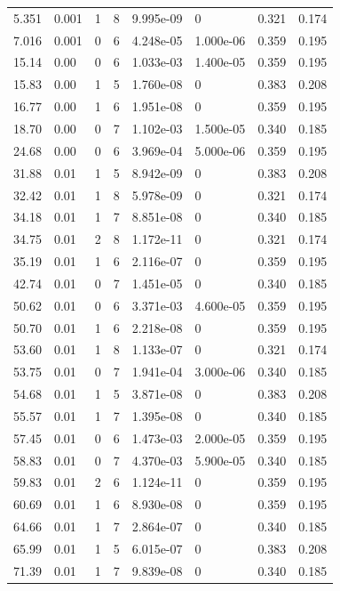 \documentclass[preview]{standalone}
\begin{document}
{{\begin{tabular}{L{1.2cm}C{1.2cm} C{0.3cm}C{0.5cm} C{1.4cm}C{1.4cm} C{1.4cm}C{1.4cm}}
  5.351  &  0.001  & 1     &  8 &  9.995e-09  & 0  & 0.321 &  0.174   \\ 
  7.016  &  0.001  & 0     &  6 &  4.248e-05  & 1.000e-06  & 0.359 &  0.195   \\ 
  15.14  &  0.00  & 0     &  6 &  1.033e-03  & 1.400e-05  & 0.359 &  0.195   \\ 
  15.83  &  0.00  & 1     &  5 &  1.760e-08  & 0  & 0.383 &  0.208   \\ 
  16.77  &  0.00  & 1     &  6 &  1.951e-08  & 0  & 0.359 &  0.195   \\ 
  18.70  &  0.00  & 0     &  7 &  1.102e-03  & 1.500e-05  & 0.340 &  0.185   \\ 
  24.68  &  0.00  & 0     &  6 &  3.969e-04  & 5.000e-06  & 0.359 &  0.195   \\ 
  31.88  &  0.01  & 1     &  5 &  8.942e-09  & 0  & 0.383 &  0.208   \\ 
  32.42  &  0.01  & 1     &  8 &  5.978e-09  & 0  & 0.321 &  0.174   \\ 
  34.18  &  0.01  & 1     &  7 &  8.851e-08  & 0  & 0.340 &  0.185   \\ 
  34.75  &  0.01  & 2     &  8 &  1.172e-11  & 0  & 0.321 &  0.174   \\ 
  35.19  &  0.01  & 1     &  6 &  2.116e-07  & 0  & 0.359 &  0.195   \\ 
  42.74  &  0.01  & 0     &  7 &  1.451e-05  & 0  & 0.340 &  0.185   \\ 
  50.62  &  0.01  & 0     &  6 &  3.371e-03  & 4.600e-05  & 0.359 &  0.195   \\ 
  50.70  &  0.01  & 1     &  6 &  2.218e-08  & 0  & 0.359 &  0.195   \\ 
  53.60  &  0.01  & 1     &  8 &  1.133e-07  & 0  & 0.321 &  0.174   \\ 
  53.75  &  0.01  & 0     &  7 &  1.941e-04  & 3.000e-06  & 0.340 &  0.185   \\ 
  54.68  &  0.01  & 1     &  5 &  3.871e-08  & 0  & 0.383 &  0.208   \\ 
  55.57  &  0.01  & 1     &  7 &  1.395e-08  & 0  & 0.340 &  0.185   \\ 
  57.45  &  0.01  & 0     &  6 &  1.473e-03  & 2.000e-05  & 0.359 &  0.195   \\ 
  58.83  &  0.01  & 0     &  7 &  4.370e-03  & 5.900e-05  & 0.340 &  0.185   \\ 
  59.83  &  0.01  & 2     &  6 &  1.124e-11  & 0  & 0.359 &  0.195   \\ 
  60.69  &  0.01  & 1     &  6 &  8.930e-08  & 0  & 0.359 &  0.195   \\ 
  64.66  &  0.01  & 1     &  7 &  2.864e-07  & 0  & 0.340 &  0.185   \\ 
  65.99  &  0.01  & 1     &  5 &  6.015e-07  & 0  & 0.383 &  0.208   \\ 
  71.39  &  0.01  & 1     &  7 &  9.839e-08  & 0  & 0.340 &  0.185   \\ 
\hline 
\end{tabular} 

}}
\end{document}
